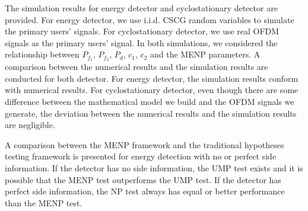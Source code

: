 The simulation results for energy detector and cyclostationary detector are provided. 
For energy detector, we use i.i.d. CSCG random variables to simulate the primary users' signals. For cyclostationary detector, we use real OFDM signals as the primary users' signal.  
In both simulations, we considered the relationship between $P_{f_1}$, $P_{f_2}$, $P_d$, $c_1$, $c_2$ and the MENP parameters.  A comparison between the numerical results and the simulation results are conducted for both detector.
For energy detector, the simulation results conform with numerical results. For cyclostationary detector, even though there are some difference between the mathematical model we build and the OFDM signals we generate, the deviation between the numerical results and the simulation results are negligible.  

A comparison between the MENP framework and the traditional hypotheses testing framework is presented for energy detection with no or perfect side information. If the detector has no side information, the UMP test exists and  it is possible that the MENP test outperforms the UMP test. If the detector has perfect side information, the NP test always has equal or better performance than the MENP test.  
